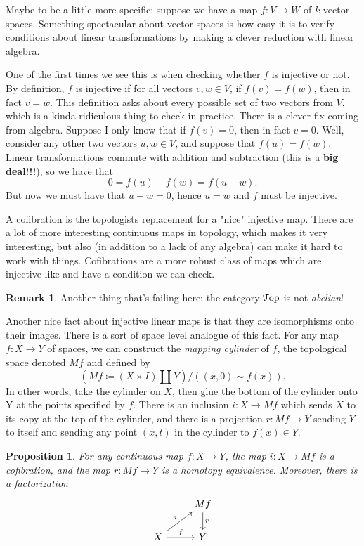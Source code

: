 \documentclass[10pt]{amsart}
\newcommand{\euscr}[1]{\EuScript{#1}}
\newtheorem{proposition}[thm]{Proposition}
\theoremstyle{definition}
\newtheorem{rmk}[thm]{Remark}
\newcommand{\cdef}[1]{\textcolor{Bittersweet}{#1}}
\begin{document}
Maybe to be a little more specific: suppose we have a map $f:V \to W$ of $k$-vector spaces. Something spectacular about vector spaces is how easy it is to verify conditions about linear transformations by making a clever reduction with linear algebra. 
    
One of the first times we see this is when checking whether $f$ is injective or not. By definition, $f$ is injective if for all vectors $v , w \in V$, if $f(v)=f(w)$, then in fact $v=w$. This definition asks about every possible set of two vectors from $V$, which is a kinda ridiculous thing to check in practice. There is a clever fix coming from algebra. Suppose I only know that if $f(v)=0$, then in fact $v=0$. Well, consider any other two vectors $u, w \in V$, and suppose that $f(u)=f(w)$. Linear transformations commute with addition and subtraction (this is a \textbf{big deal!!!}), so we have that
\[
0 = f(u)-f(w) = f(u-w).
\]
But now we must have that $u-w=0$, hence $u=w$ and $f$ must be injective.

A cofibration is the topologists replacement for a "nice" injective map. There are a lot of more interesting continuous maps in topology, which makes it very interesting, but also (in addition to a lack of any algebra) can make it hard to work with things. Cofibrations are a more robust class of maps which are injective-like and have a condition we can check.

\begin{rmk}
    Another thing that's failing here: the category $\euscr{T}\mathrm{op}$ is not \emph{abelian}!
\end{rmk}

Another nice fact about injective linear maps is that they are isomorphisms onto their images. There is a sort of space level analogue of this fact. For any map $f:X \to Y$ of spaces, we can construct the \cdef{\emph{mapping cylinder}} of $f$, the topological space denoted $Mf$ and defined by
\[
(Mf \coloneq (X \times I) \amalg Y)/((x,0) \sim f(x)).
\]
In other words, take the cylinder on $X$, then glue the bottom of the cylinder onto Y at the points specified by $f$. There is an inclusion $i:X \to Mf$ which sends $X$ to its copy at the top of the cylinder, and there is a projection $r:Mf \to Y$ sending $Y$ to itself and sending any point $(x,t)$ in the cylinder to $f(x) \in Y$. 

\begin{proposition}
    For any continuous map $f:X \to Y$, the map $i:X \to Mf$ is a cofibration, and the map $r:Mf \to Y$ is a homotopy equivalence. Moreover, there is a factorization
    \[\begin{tikzcd}
	& Mf \\
	X & Y
	\arrow["r", from=1-2, to=2-2]
	\arrow["i", from=2-1, to=1-2]
	\arrow["f", from=2-1, to=2-2]
    \end{tikzcd}\]
\end{proposition}
\end{document}
